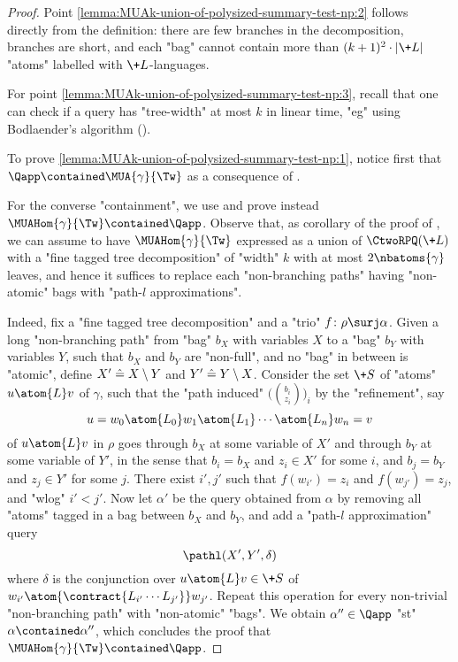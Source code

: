 \begin{proof}
	Point \eqref{lemma:MUAk-union-of-polysized-summary-test-np:2} follows directly from the definition: there are few branches in the decomposition, branches are short, and each "bag" cannot contain more than $(k+1)^2 \cdot |\+L|$ "atoms" labelled with $\+L$-languages.

	For point \eqref{lemma:MUAk-union-of-polysized-summary-test-np:3}, recall that one can check if a query has "tree-width" at most $k$ in linear time, "eg" using Bodlaender's algorithm ().


	To prove \eqref{lemma:MUAk-union-of-polysized-summary-test-np:1}, notice first that 
	$\Qapp \contained \MUA{\gamma}{\Tw}$ as a consequence
	of .

	For the converse "containment", we use 
	and prove instead $\MUAHom{\gamma}{\Tw} \contained \Qapp$.
	Observe that, as corollary of the proof of , we can assume to have 
	$\MUAHom{\gamma}{\Tw}$ expressed as a union of $\CtwoRPQ(\+L)$ with a "fine tagged tree decomposition" of "width" $k$ with at most $2\nbatoms{\gamma}$ leaves, and hence it suffices to replace each "non-branching paths" having "non-atomic" bags with "path-$l$ approximations".

	Indeed, fix a "fine tagged tree decomposition" and a "trio"
	$\fun\colon \rho \surj \alpha$. Given a long "non-branching path" from "bag" $b_X$ with
	variables $X$ to a "bag" $b_Y$ with variables $Y$,
	such that $b_X$ and $b_Y$ are "non-full", and no "bag" in between is "atomic",
	define $X' \mathrel{\hat{=}} X \setminus Y$ and $Y' \mathrel{\hat{=}} Y \setminus X$.
	Consider the set $\+S$ of "atoms" $u \atom{L} v$ of $\gamma$, such that the "path induced"
	$\bigl( {b_i \choose z_i} \bigr)_i$ by the "refinement", say
	\[
		u = w_0 \atom{L_0} w_1 \atom{L_1} \cdots \atom{L_n} w_n	= v
	\]
	of $u \atom{L} v$ in $\rho$ 
	goes through $b_X$ at some variable of $X'$ and through $b_Y$ at some variable
	of $Y'$, in the sense that $b_i = b_X$ and $z_i \in X'$ for some $i$,
	and $b_j = b_Y$ and $z_j \in Y'$ for some $j$.
	There exist $i', j'$ such that $f(w_{i'}) = z_i$ and $f(w_{j'}) = z_j$,
	and "wlog" $i' < j'$.
	Now let $\alpha'$ be the query obtained from $\alpha$ by removing all "atoms" tagged in a bag between $b_X$ and $b_Y$, and add a "path-$l$ approximation" query
	\[
		\pathl(X', Y', \delta)
	\]
	where $\delta$ is the conjunction over $u \atom{L} v \in \+S$ of
	$w_{i'} \atom{\contract{L_{i'}\cdots L_{j'}}} w_{j'}$.
	Repeat this operation for every non-trivial "non-branching path" with
	"non-atomic" "bags". We obtain $\alpha'' \in \Qapp$ "st"
	$\alpha \contained \alpha''$, which concludes the proof
	that $\MUAHom{\gamma}{\Tw} \contained \Qapp$.
\end{proof}


